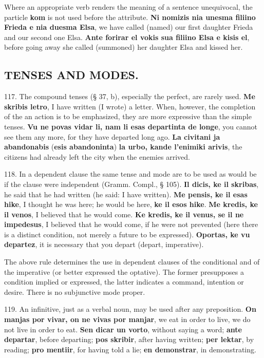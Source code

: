 Where an appropriate verb renders the meaning of a sentence unequivocal, the particle \textbf{kom} is not used before the attribute. \textbf{Ni nomizis nia unesma filiino Frieda e nia duesma Elsa}, we have called (named) our first daughter Frieda and our second one Elsa. \textbf{Ante forirar el vokis sua filiino Elsa e kisis el}, before going away she called (summoned) her daughter Elsa and kissed her.

\subsection*{TENSES AND MODES.}
117. The compound tenses (§ 37, b), especially the perfect, are rarely used. \textbf{Me skribis letro}, I have written (I wrote) a letter. When, however, the completion of the an action is to be emphasized, they are more expressive than the simple tenses. \textbf{Vu ne povas vidar li, nam li esas departinta de longe}, you cannot see them any more, for they have departed long ago. \textbf{La civitani ja abandonabis }(\textbf{esis abandoninta})\textbf{ la urbo, kande l'enimiki arivis}, the citizens had already left the city when the enemies arrived.

118. In a dependent clause the same tense and mode are to be used as would be if the clause were independent (Gramm. Compl., § 105). \textbf{Il dicis, ke il skribas}, he said that he had written (he said: I have written). \textbf{Me pensis, ke il esas hike}, I thought he was here; he would be here, \textbf{ke il esos hike}. \textbf{Me kredis, ke il venos}, I believed that he would come. \textbf{Ke kredis, ke il venus, se il ne impedesus}, I believed that he would come, if he were not prevented (here there is a distinct condition, not merely a future to be expressed). \textbf{Oportas, ke vu departez}, it is necessary that you depart (depart, imperative).

The above rule determines the use in dependent clauses of the conditional and of the imperative (or better expressed the optative). The former presupposes a condition implied or expressed, the latter indicates a command, intention or desire. There is no subjunctive mode proper.

119. An infinitive, just as a verbal noun, may be used after any preposition. \textbf{On manjas por vivar, on ne vivas por manjar}, we eat in order to live, we do not live in order to eat. \textbf{Sen dicar un vorto}, without saying a word; \textbf{ante departar}, before departing; \textbf{pos skribir}, after having written; \textbf{per lektar}, by reading; \textbf{pro mentiir}, for having told a lie; \textbf{en demonstrar}, in demonstrating.


